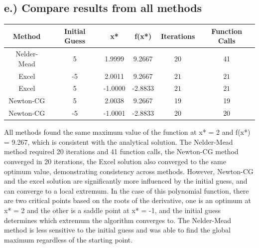 \documentclass{article}%
\begin{document}
%
\subsection*{e.) Compare results from all methods}%
\label{subsec:e.)Compareresultsfromallmethods}%
\begin{table}[H]%
\centering%
\begin{tabular}{cccccc}%
\hline%
Method&Initial Guess&x*&f(x*)&Iterations&Function Calls\\%
\hline%
Nelder{-}Mead&5&1.9999&9.2667&20&41\\%
\hline%
Excel&{-}5&2.0011&9.2667&$21$&$21$\\%
\hline%
Excel&5&{-}1.0000&{-}2.8833&$21$&$21$\\%
\hline%
Newton{-}CG&5&2.0038&9.2667&19&19\\%
\hline%
Newton{-}CG&{-}5&{-}1.0001&{-}2.8833&20&20\\%
\hline%
\end{tabular}%
\end{table}%
All methods found the same maximum value of the function at x* = 2 and f(x*) = 9.267, which is consistent with the analytical solution. The Nelder{-}Mead method required 20 iterations and 41 function calls, the Newton{-}CG method converged in 20 iterations, the Excel solution also converged to the same optimum value, demonstrating consistency across methods. However, Newton{-}CG and the excel solution are significantly more influenced by the initial guess, and can converge to a local extremum. In the case of this polynomial function, there are two critical points based on the roots of the derivative, one is an optimum at x* = 2 and the other is a saddle point at x* = {-}1, and the initial guess determines which extremum the algorithm converges to. The Nelder{-}Mead method is less sensitive to the initial guess and was able to find the global maximum regardless of the starting point.%
\par

%
\end{document}
